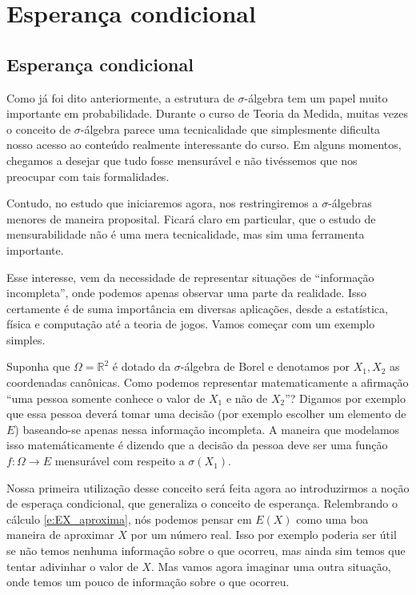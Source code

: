 \chapter{Esperança condicional}

\section{Esperança condicional}

Como já foi dito anteriormente, a estrutura de $\sigma$-álgebra tem um papel muito importante em probabilidade.
Durante o curso de Teoria da Medida, muitas vezes o conceito de $\sigma$-álgebra parece uma tecnicalidade que simplesmente dificulta nosso acesso ao conteúdo realmente interessante do curso.
Em alguns momentos, chegamos a desejar que tudo fosse mensurável e não tivéssemos que nos preocupar com tais formalidades.

Contudo, no estudo que iniciaremos agora, nos restringiremos a $\sigma$-álgebras menores de maneira proposital.
Ficará claro em particular, que o estudo de mensurabilidade não é uma mera tecnicalidade, mas sim uma ferramenta importante.

Esse interesse, vem da necessidade de representar situações de ``informação incompleta'', onde podemos apenas observar uma parte da realidade.
Isso certamente é de suma importância em diversas aplicações, desde a estatística, física e computação até a teoria de jogos.
Vamos começar com um exemplo simples.

Suponha que $\Omega = \mathbb{R}^2$ é dotado da $\sigma$-álgebra de Borel e denotamos por $X_1, X_2$ as coordenadas canônicas.
Como podemos representar matematicamente a afirmação ``uma pessoa somente conhece o valor de $X_1$ e não de $X_2$''?
Digamos por exemplo que essa pessoa deverá tomar uma decisão (por exemplo escolher um elemento de $E$) baseando-se apenas nessa informação incompleta.
A maneira que modelamos isso matemáticamente é dizendo que a decisão da pessoa deve ser uma função $f: \Omega \to E$ mensurável com respeito a $\sigma(X_1)$.

Nossa primeira utilização desse conceito será feita agora ao introduzirmos a noção de esperaça condicional, que generaliza o conceito de esperança.
Relembrando o cálculo \eqref{e:EX_aproxima}, nós podemos pensar em $E(X)$ como uma boa maneira de aproximar $X$ por um número real.
Isso por exemplo poderia ser útil se não temos nenhuma informação sobre o que ocorreu, mas ainda sim temos que tentar adivinhar o valor de $X$.
Mas vamos agora imaginar uma outra situação, onde temos um pouco de informação sobre o que ocorreu.

